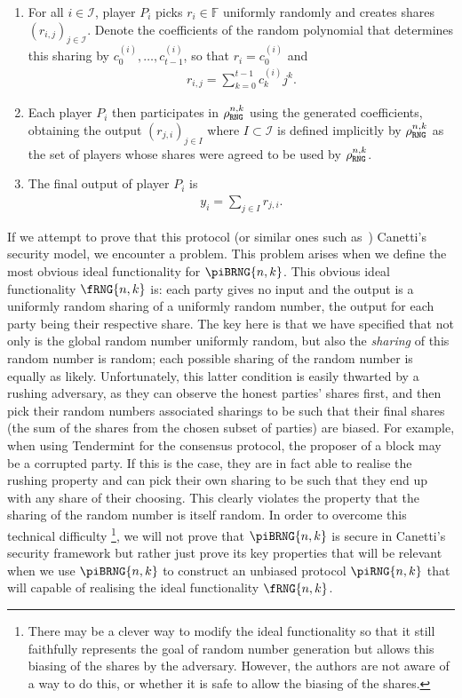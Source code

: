 \documentclass{article}
\theoremstyle{remark}
\newcommand{\F}{\mathbb{F}}
\begin{document}
\begin{enumerate}
	\item For all $i \in \mathcal{I}$, player $P_i$ picks $r_i \in \F$
		uniformly randomly and creates shares ${(r_{i,j})}_{j \in
		\mathcal{I}}$.  Denote the coefficients of the random polynomial that
		determines this sharing by $c_0^{(i)}, \ldots, c_{t-1}^{(i)}$, so that
		$r_i = c_0^{(i)}$ and
		\begin{align*}
			r_{i, j} = \sum_{k=0}^{t-1} c_k^{(i)} j^k.
		\end{align*}

	\item Each player $P_i$ then participates in $\rho_\texttt{RNG}^{n, k}$ using the
		generated coefficients, obtaining the output ${(r_{j, i})}_{j \in
		I}$ where $I \subset \mathcal{I}$ is defined implicitly by
		$\rho_\texttt{RNG}^{n, k}$ as the set of players whose shares were agreed to be
		used by $\rho_\texttt{RNG}^{n, k}$.

	\item The final output of player $P_i$ is
		\begin{align*}
			y_i = \sum_{j \in I} r_{j, i}.
		\end{align*}
\end{enumerate}

If we attempt to prove that this protocol (or similar ones such
as~\cite{gjkr96}) Canetti's security model, we encounter a problem. This
problem arises when we define the most obvious ideal functionality for
$\piBRNG{n,k}$. This obvious ideal functionality $\fRNG{n,k}$ is: each party
gives no input and the output is a uniformly random sharing of a uniformly
random number, the output for each party being their respective share. The key
here is that we have specified that not only is the global random number
uniformly random, but also the \textit{sharing} of this random number is
random; each possible sharing of the random number is equally as likely.
Unfortunately, this latter condition is easily thwarted by a rushing adversary,
as they can observe the honest parties' shares first, and then pick their
random numbers associated sharings to be such that their final shares (the sum
of the shares from the chosen subset of parties) are biased. For example, when
using Tendermint for the consensus protocol, the proposer of a block may be a
corrupted party. If this is the case, they are in fact able to realise the
rushing property and can pick their own sharing to be such that they end up
with any share of their choosing. This clearly violates the property that the
sharing of the random number is itself random. In order to overcome this
technical difficulty%
\footnote{%
	There may be a clever way to modify the ideal functionality so that it
	still faithfully represents the goal of random number generation but allows
	this biasing of the shares by the adversary. However, the authors are not
	aware of a way to do this, or whether it is safe to allow the biasing of
	the shares.
}, we will not prove that $\piBRNG{n,k}$ is secure in
Canetti's security framework but rather just prove its key properties that will
be relevant when we use $\piBRNG{n,k}$ to construct an unbiased protocol
$\piRNG{n,k}$ that will capable of realising the ideal functionality
$\fRNG{n,k}$.
\end{document}
